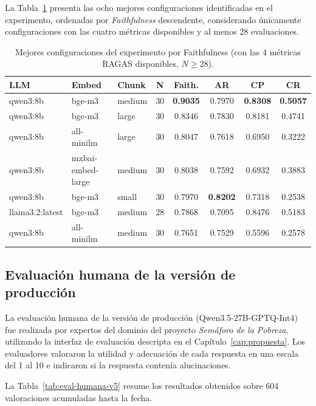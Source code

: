 La Tabla~\ref{tab:ragas-mejores} presenta las ocho mejores configuraciones identificadas en el experimento, ordenadas por \textit{Faithfulness} descendente, considerando únicamente configuraciones con las cuatro métricas disponibles y al menos 28 evaluaciones.

\begin{table}[H]
\centering
\scriptsize
\begin{tabular}{|l|l|l|c|c|c|c|c|}
\hline
\textbf{LLM} & \textbf{Embed} & \textbf{Chunk} & \textbf{N} & \textbf{Faith.} & \textbf{AR} & \textbf{CP} & \textbf{CR} \\
\hline
qwen3:8b        & bge-m3            & medium & 30 & \textbf{0.9035} & 0.7970 & \textbf{0.8308} & \textbf{0.5057} \\
qwen3:8b        & bge-m3            & large  & 30 & 0.8346 & 0.7830 & 0.8181 & 0.4741 \\
qwen3:8b        & all-minilm        & large  & 30 & 0.8047 & 0.7618 & 0.6950 & 0.3222 \\
qwen3:8b        & mxbai-embed-large & medium & 30 & 0.8038 & 0.7592 & 0.6932 & 0.3883 \\
qwen3:8b        & bge-m3            & small  & 30 & 0.7970 & \textbf{0.8202} & 0.7318 & 0.2538 \\
llama3.2:latest & bge-m3            & medium & 28 & 0.7868 & 0.7095 & 0.8476 & 0.5183 \\
qwen3:8b        & all-minilm        & medium & 30 & 0.7651 & 0.7529 & 0.5596 & 0.2578 \\
\hline
\end{tabular}
\caption{Mejores configuraciones del experimento por Faithfulness (con las 4 métricas RAGAS disponibles, $N \geq 28$).}
\label{tab:ragas-mejores}
\end{table}

\subsection{Evaluación humana de la versión de producción}\label{sec:eval_humana_v5}

La evaluación humana de la versión de producción (Qwen3.5-27B-GPTQ-Int4) fue realizada por expertos del dominio del proyecto \textit{Semáforo de la Pobreza}, utilizando la interfaz de evaluación descripta en el Capítulo~\ref{cap:propuesta}. Los evaluadores valoraron la utilidad y adecuación de cada respuesta en una escala del 1 al 10 e indicaron si la respuesta contenía alucinaciones.

La Tabla~\ref{tab:eval-humana-v5} resume los resultados obtenidos sobre 604 valoraciones acumuladas hasta la fecha.

